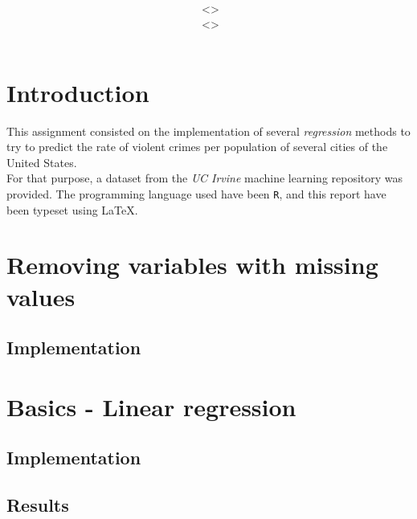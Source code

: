 \documentclass[12pt,a4paper]{article}
\title{\vspace{2in}\textmd{\hmwkClass\\\textbf{\hmwkTitle}}\\\normalsize\vspace{0.1in}\small{\hmwkDueDate}\\\vspace{4in}}
\date{}
\author{\textbf{\hmwkAuthorNameA} $\;$<\texttt{\href{mailto:laane2@illinois.edu}{\hmwkAuthorEmailA}}>\\\textbf{\hmwkAuthorNameB} $\;$<\texttt{\href{mailto:ruizcep2@illinois.edu}{\hmwkAuthorEmailB}}>}
\begin{document}
\begin{singlespace}

\begin{titlepage}
\maketitle
\thispagestyle{empty}
\end{titlepage}

\tableofcontents
\newpage


\clearpage

\section{Introduction}
This assignment consisted on the implementation of several \emph{regression} methods to try to predict the rate of violent crimes per population of several cities of the United States. \\

For that purpose, a dataset from the \emph{UC Irvine} machine learning repository was provided. The programming language used have been \texttt{R}, and this report have been typeset using \LaTeX.

\section{Removing variables with missing values}
\subsection{Implementation}


\section{Basics - Linear regression}
\subsection{Implementation}


\subsection{Results}


\end{singlespace}
\end{document}
